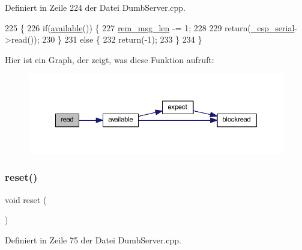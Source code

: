 Definiert in Zeile 224 der Datei Dumb\+Server.\+cpp.


\begin{DoxyCode}
225 \{
226   \textcolor{keywordflow}{if}(\hyperlink{class_esp_server_a4549a76725f2e4c013e4d57018366109}{available}()) \{
227     \hyperlink{class_esp_server_a34a62d83c82a13f441af983f9b212e25}{rem\_msg\_len} -= 1;
228 
229     \textcolor{keywordflow}{return}(\hyperlink{class_esp_server_a552aab874ad99b696f4c997d6f5a4746}{\_esp\_serial}->read());
230   \}
231   \textcolor{keywordflow}{else} \{
232     \textcolor{keywordflow}{return}(-1);
233   \}
234 \}
\end{DoxyCode}
Hier ist ein Graph, der zeigt, was diese Funktion aufruft\+:\nopagebreak
\begin{figure}[H]
\begin{center}
\leavevmode
\includegraphics[width=350pt]{class_esp_server_aaab5dab5b969a87f538242e524431637_cgraph}
\end{center}
\end{figure}
\mbox{\label{class_esp_server_ad20897c5c8bd47f5d4005989bead0e55}} 
\subsubsection{\texorpdfstring{reset()}{reset()}}
{\footnotesize\ttfamily void reset (\begin{DoxyParamCaption}{ }\end{DoxyParamCaption})\hspace{0.3cm}{\ttfamily [private]}}



Definiert in Zeile 75 der Datei Dumb\+Server.\+cpp.



